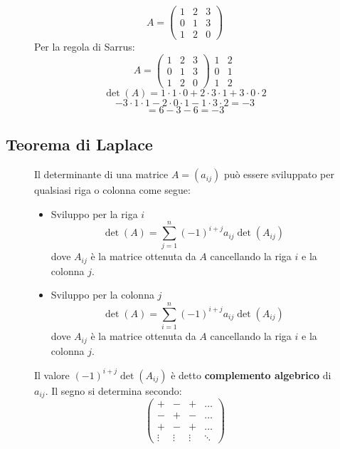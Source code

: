 \documentclass[a4paper]{article}
\theoremstyle{break}
\theoremstyle{break}
\theoremstyle{break}
\theoremstyle{break}
\begin{document}
\begin{figure}[H]
  \begin{example}
    \[
    A = \begin{pmatrix} 
      1 & 2 & 3\\
      0 & 1 & 3\\
      1 & 2 & 0
    \end{pmatrix} 
    \] 
    Per la regola di Sarrus:
    \[
      A = \begin{pmatrix} 
        1 & 2 & 3\\
        0 & 1 & 3\\
        1 & 2 & 0
      \end{pmatrix} 
      \begin{matrix} 
        1 & 2\\
        0 & 1\\
        1 & 2
      \end{matrix} 
    \] 
    \[
    \det(A) = 1 \cdot 1 \cdot 0 + 2 \cdot 3 \cdot 1 + 3 \cdot 0 \cdot 2 
    \] 
    \[
    - 3 \cdot 1 \cdot 1 - 2 \cdot 0 \cdot 1 - 1 \cdot 3 \cdot 2 = -3
    \] 
    \[
    = 6 - 3 - 6 = -3
    \] 
  \end{example}
\end{figure}

\subsection{Teorema di Laplace}
\begin{figure}[H]
  \begin{definition}
    Il determinante di una matrice \( A = (a_{ij}) \) può essere sviluppato per qualsiasi
    riga o colonna come segue:
    \begin{itemize}
      \item Sviluppo per la riga \( i \) 
        \[
        \det(A) = \sum_{j=1}^{n}(-1)^{i+j}a_{ij}\det(A_{ij})
        \] 
        dove \( A_{ij} \) è la matrice ottenuta da \( A \) cancellando la riga \( i \) e
        la colonna \( j \).
      \item Sviluppo per la colonna \( j \) 
        \[
        \det(A) = \sum_{i=1}^{n}(-1)^{i+j}a_{ij}\det(A_{ij})
        \] 
        dove \( A_{ij} \) è la matrice ottenuta da \( A \) cancellando la riga \( i \) e
        la colonna \( j \).
    \end{itemize}
    Il valore \( (-1)^{i+j} \det(A_{ij}) \) è detto \textbf{complemento algebrico} di
    \( a_{ij} \). Il segno si determina secondo:
    \[
      \begin{pmatrix} 
        + & - & + & \ldots\\
        - & + & - & \ldots\\
        + & - & + & \ldots\\
        \vdots & \vdots & \vdots & \ddots
      \end{pmatrix} 
    \] 
  \end{definition}
\end{figure}
\end{document}
